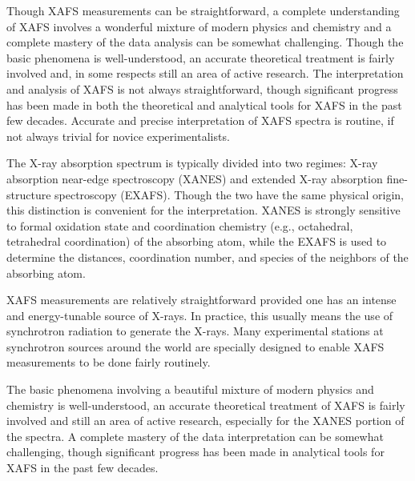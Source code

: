 Though XAFS measurements can be straightforward, a complete understanding
of XAFS involves a wonderful mixture of modern physics and chemistry and a
complete mastery of the data analysis can be somewhat challenging.  Though
the basic phenomena is well-understood, an accurate theoretical treatment
is fairly involved and, in some respects still an area of active
research. The interpretation and analysis of XAFS is not always
straightforward, though significant progress has been made in both the
theoretical and analytical tools for XAFS in the past few decades.
Accurate and precise interpretation of XAFS spectra is routine, if not
always trivial for novice experimentalists.

The X-ray absorption spectrum is typically divided into two regimes: X-ray
absorption near-edge spectroscopy (XANES) and extended X-ray absorption
fine-structure spectroscopy (EXAFS).  Though the two have the same physical
origin, this distinction is convenient for the interpretation. XANES is
strongly sensitive to formal oxidation state and coordination chemistry
(e.g., octahedral, tetrahedral coordination) of the absorbing atom, while
the EXAFS is used to determine the distances, coordination number, and
species of the neighbors of the absorbing atom.

XAFS measurements are relatively straightforward provided one has an
intense and energy-tunable source of X-rays.  In practice, this usually
means the use of synchrotron radiation to generate the X-rays.  Many
experimental stations at synchrotron sources around the world are specially
designed to enable XAFS measurements to be done fairly routinely.

The basic phenomena involving a beautiful mixture of modern physics and
chemistry is well-understood, an accurate theoretical treatment of XAFS is
fairly involved and still an area of active research, especially for the
XANES portion of the spectra.  A complete mastery of the data
interpretation can be somewhat challenging, though significant progress has
been made in analytical tools for XAFS in the past few decades.

